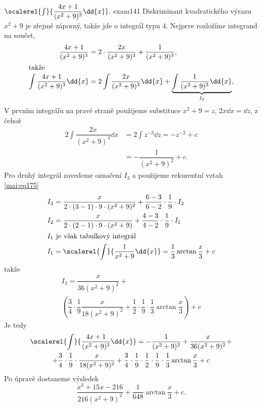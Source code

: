 \begin{mathexam}{\(\scalerel{\int}{\dfrac{4x + 1}{(x^2 + 9)^3}\dd{x}}.\)
  \hfill\cite[s.~76]{Knichal}}{exam141} 
  Diskriminant kvadratického výrazu \(x^2+9\) je zřejmě záporný, takže jde o integrál typu 4.
  Nejprve rozložíme integrand na součet,
  \begin{align*}
    \dfrac{4x+1}{(x^2+9)^3} 
      &= 2\cdot\dfrac{2x}{(x^2+9)^3} + \dfrac{1}{(x^2+9)^3},             \\
    \shortintertext{takže}
    \int\dfrac{4x+1}{(x^2+9)^3}\dd{x} 
      &= 2\int\dfrac{2x}{(x^2+9)^3}\dd{x} + \underbrace{\int\dfrac{1}{(x^2+9)^3}\dd{x}}_{I_3},
  \end{align*}
  V prvním integrálu na pravé straně použijeme substituce \(x^2+9=z\), \(2x\dd{x} = \dd{z}\), z
  čehož 
  \begin{align*}
    2\int\dfrac{2x}{(x^2+9)^3}\dd{x} 
      &= 2\int z^{-3}\dd{z} = -z^{-2} + c  \\
      &= -\dfrac{1}{(x^2+9)^2} + c.
  \end{align*}  
  Pro druhý integrál zavedeme označení \(I_3\) a použijeme rekurentní vztah \ref{mai:eq175}
  \begin{align*}
    I_3 &= \dfrac{x}{2\cdot(3-1)\cdot9\cdot(x^2+9)^2}+\dfrac{6-3}{6-2}\cdot\dfrac{1}{9}\cdot I_2\\
    I_2 &= \dfrac{x}{2\cdot(2-1)\cdot9\cdot(x^2+9)  }+\dfrac{4-3}{4-2}\cdot\dfrac{1}{9}\cdot I_1\\
    \shortintertext{\(I_1\) je však tabulkový integrál}
    I_1 &= \scalerel{\int}{\dfrac{1}{x^2+9}\dd{x}} = \dfrac{1}{3}\arctan\dfrac{x}{3} + c
  \end{align*}
  takže
  \begin{multline*}
    I_3 = 
      \dfrac{x}{36(x^2+9)^2} +        \\
        \left(
          \dfrac{3}{4}\cdot\dfrac{1}{9}\dfrac{x}{18(x^2+9)^2} + 
          \dfrac{1}{2}\cdot\dfrac{1}{9}\cdot\dfrac{1}{3}\arctan\dfrac{x}{3}
        \right) + c
  \end{multline*}
  Je tedy
  \begin{multline*}
    \scalerel{\int}{\dfrac{4x + 1}{(x^2 + 9)^3}\dd{x}} 
      = - \dfrac{1}{(x^2+9)^2} + \dfrac{x}{36(x^2+9)^2} +            \\
        + \dfrac{3}{4}\cdot\dfrac{1}{9}\cdot\dfrac{x}{18(x^2+9)^2}
        + \dfrac{3}{4}\cdot\dfrac{1}{9}\cdot\dfrac{1}{2}\cdot
          \dfrac{1}{9}\cdot\dfrac{1}{3}\arctan\dfrac{x}{3} + c
  \end{multline*}
  Po úpravě dostaneme výsledek
  \begin{equation*}
    \dfrac{x^3+15x-216}{216(x^2+9)^2} + \dfrac{1}{648}\arctan\dfrac{x}{3} + c.
  \end{equation*}
\end{mathexam}